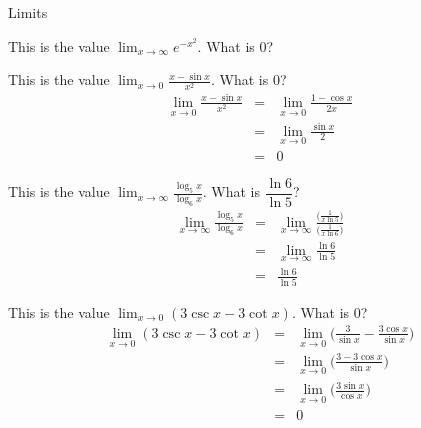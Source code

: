 \documentclass{article}
\begin{document}
\begin{category}{Limits}

  \begin{clue}
    This is the value $\displaystyle\lim_{x\to\infty} e^{-x^2}.$
  \response
    What is $0$?
  \end{clue}

  \begin{clue}
    This is the value $\displaystyle \lim_{x\to 0}\frac{x-\sin x}{x^2}.$
  \response
    What is $0$?
  \solution
    \[
    \begin{array}{rcl}
    {\displaystyle \lim_{x\to 0}\frac{x-\sin x}{x^2}} & = & {\displaystyle \lim_{x\to 0}\frac{1-\cos x}{2x}} \\
    & = & {\displaystyle \lim_{x\to 0}\frac{\sin x}{2}}\\
    & = & 0
    \end{array}
    \]
  \end{clue}

  \begin{clue}
    This is the value $\displaystyle\lim_{x\to\infty}\frac{\log_5 x}{\log_6 x}.$
  \response
    What is $\dfrac{\ln 6}{\ln 5}$?
  \solution
    \[
    \begin{array}{rcl}
    {\displaystyle\lim_{x\to\infty}\frac{\log_5 x}{\log_6 x}} & = & {\displaystyle\lim_{x\to\infty}\frac{\Big(\frac{1}{x\ln 5}\Big)}{\Big(\frac{1}{x\ln 6}\Big)}} \\
    & = & {\displaystyle\lim_{x\to\infty}\frac{\ln 6}{\ln 5}}\\
    & = & {\displaystyle \frac{\ln 6}{\ln 5}}
    \end{array}
    \]
  \end{clue}

  \begin{clue}
    This is the value $\displaystyle \lim_{x\to 0}(3\csc x-3\cot x).$
  \response
    What is $0$?
  \solution
    \[
    \begin{array}{rcl}
    {\displaystyle \lim_{x\to 0}(3\csc x-3\cot x)} & = & {\displaystyle \lim_{x\to 0}\Big(\frac{3}{\sin x}-\frac{3\cos x}{\sin x}\Big)} \\
    & = & {\displaystyle \lim_{x\to 0}\Big(\frac{3-3\cos x}{\sin x}\Big)}\\
    & = & {\displaystyle \lim_{x\to 0}\Big(\frac{3\sin x}{\cos x}\Big)}\\
    & = & 0
    \end{array}
    \]
  \end{clue}


\end{category}
\end{document}
